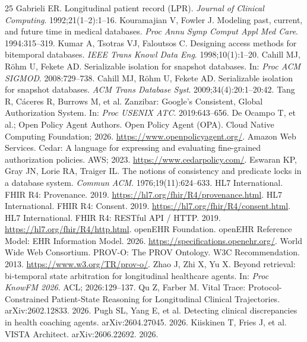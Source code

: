 \documentclass[11pt]{article}
\begin{document}
\begin{thebibliography}{25}
 Gabrieli ER. Longitudinal patient record (LPR). \emph{Journal of Clinical Computing}. 1992;21(1--2):1--16.
 Kouramajian V, Fowler J. Modeling past, current, and future time in medical databases. \emph{Proc Annu Symp Comput Appl Med Care}. 1994:315--319.
 Kumar A, Tsotras VJ, Faloutsos C. Designing access methods for bitemporal databases. \emph{IEEE Trans Knowl Data Eng}. 1998;10(1):1--20.
 Cahill MJ, R{\"o}hm U, Fekete AD. Serializable isolation for snapshot databases. In: \emph{Proc ACM SIGMOD}. 2008:729--738.
 Cahill MJ, R{\"o}hm U, Fekete AD. Serializable isolation for snapshot databases. \emph{ACM Trans Database Syst}. 2009;34(4):20:1--20:42.
 Tang R, C{\'a}ceres R, Burrows M, et al. Zanzibar: Google's Consistent, Global Authorization System. In: \emph{Proc USENIX ATC}. 2019:643--656.
 De Ocampo T, et al.; Open Policy Agent Authors. Open Policy Agent (OPA). Cloud Native Computing Foundation; 2026. \url{https://www.openpolicyagent.org/}.
 Amazon Web Services. Cedar: A language for expressing and evaluating fine-grained authorization policies. AWS; 2023. \url{https://www.cedarpolicy.com/}.
 Eswaran KP, Gray JN, Lorie RA, Traiger IL. The notions of consistency and predicate locks in a database system. \emph{Commun ACM}. 1976;19(11):624--633.
 HL7 International. FHIR R4: Provenance. 2019. \url{https://hl7.org/fhir/R4/provenance.html}.
 HL7 International. FHIR R4: Consent. 2019. \url{https://hl7.org/fhir/R4/consent.html}.
 HL7 International. FHIR R4: RESTful API / HTTP. 2019. \url{https://hl7.org/fhir/R4/http.html}.
 openEHR Foundation. openEHR Reference Model: EHR Information Model. 2026. \url{https://specifications.openehr.org/}.
 World Wide Web Consortium. PROV-O: The PROV Ontology. W3C Recommendation. 2013. \url{https://www.w3.org/TR/prov-o/}.
 Zhao J, Zhi X, Yu X. Beyond retrieval: bi-temporal state arbitration for longitudinal healthcare agents. In: \emph{Proc KnowFM 2026}. ACL; 2026:129--137.
 Qu Z, Farber M. Vital Trace: Protocol-Constrained Patient-State Reasoning for Longitudinal Clinical Trajectories. arXiv:2602.12833. 2026.
 Pugh SL, Yang E, et al. Detecting clinical discrepancies in health coaching agents. arXiv:2604.27045. 2026.
 Kiiskinen T, Fries J, et al. VISTA Architect. arXiv:2606.22692. 2026.

\end{thebibliography}
\end{document}
